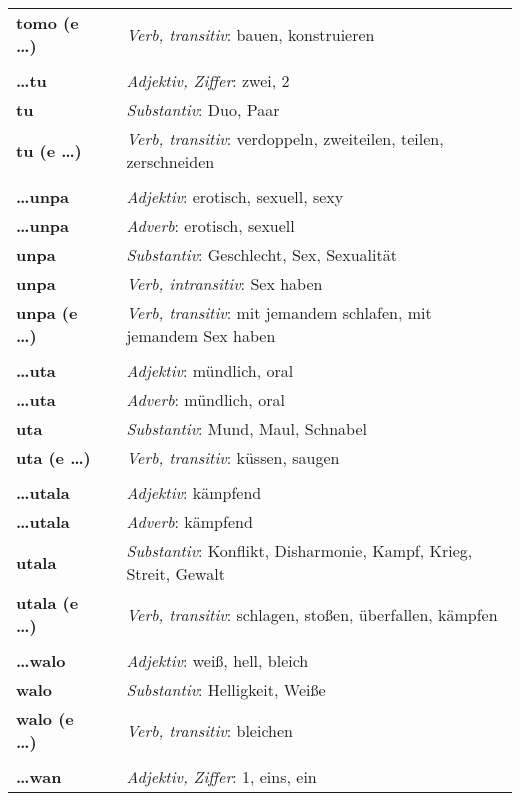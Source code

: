 \begin{supertabular}{p{2,5cm}|ll}
\textbf{tomo (e \dots)} && \textit{Verb, transitiv}: bauen, konstruieren \\ 
 && \\ %
\textbf{\dots tu} && \textit{Adjektiv, Ziffer}: zwei, 2 \\ 
\textbf{tu} && \textit{Substantiv}: Duo, Paar \\ 
\textbf{tu (e \dots)} && \textit{Verb, transitiv}: verdoppeln, zweiteilen, teilen, zerschneiden \\ 
 && \\ %
\textbf{\dots unpa} && \textit{Adjektiv}:  erotisch, sexuell, sexy \\ 
\textbf{\dots unpa} && \textit{Adverb}:  erotisch, sexuell \\ 
\textbf{unpa} && \textit{Substantiv}: Geschlecht, Sex, Sexualität \\ 
\textbf{unpa} && \textit{Verb, intransitiv}: Sex haben \\ 
\textbf{unpa (e \dots)} && \textit{Verb, transitiv}: mit jemandem schlafen, mit jemandem Sex haben \\ 
 && \\ %
\textbf{\dots uta} && \textit{Adjektiv}: mündlich, oral \\ 
\textbf{\dots uta} && \textit{Adverb}: mündlich, oral \\ 
\textbf{uta} && \textit{Substantiv}: Mund, Maul, Schnabel \\ 
\textbf{uta (e \dots)} && \textit{Verb, transitiv}: küssen, saugen \\ 
 && \\ %
\textbf{\dots utala} && \textit{Adjektiv}: kämpfend \\ 
\textbf{\dots utala} && \textit{Adverb}: kämpfend \\ 
\textbf{utala} && \textit{Substantiv}: Konflikt, Disharmonie, Kampf, Krieg, Streit, Gewalt \\ 
\textbf{utala (e \dots)} && \textit{Verb, transitiv}: schlagen, stoßen, überfallen, kämpfen \\ 
 && \\ %
\textbf{\dots walo} && \textit{Adjektiv}: weiß, hell, bleich \\ 
\textbf{walo} && \textit{Substantiv}: Helligkeit, Weiße \\ 
\textbf{walo (e \dots)} && \textit{Verb, transitiv}: bleichen \\ 
 && \\ %
\textbf{\dots wan} && \textit{Adjektiv, Ziffer}: 1, eins, ein \\ 

\end{supertabular}
